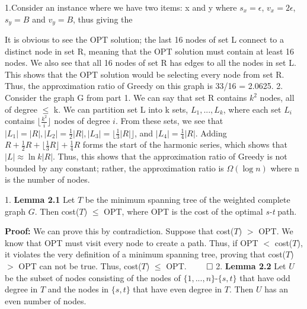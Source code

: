 \documentclass[oneside]{homework} %
\begin{document}
\maketitle
\skipevenpage

{\large1.}Consider an instance where we have two items: x and y where $s_x = \epsilon$, $v_x = 2\epsilon$, $s_y = B$ and $v_y =B$, thus giving the 

It is obvious to see the OPT solution; the last 16 nodes of set L connect to a distinct node in set R, meaning that the OPT solution must contain at least 16 nodes. We also see that all 16 nodes of set R has edges to all the nodes in set L. This shows that the OPT solution would be selecting every node from set R. Thus, the approximation ratio of Greedy on this graph is 33/16 = 2.0625.
\newline
\newline
{\large2.} Consider the graph G from part 1. We can say that set R contains $k^2$ nodes, all of degree $\leq$ k. We can partition set L into k sets, $L_1,...,L_k$, where each set $L_i$ contains $\lfloor$$\frac{k^2}{i}$$\rfloor$ nodes of degree $i$. From these sets, we see that $|L_1| = |R|, |L_2| = \frac{1}{2}|R|, |L_3| = \lfloor\frac{1}{3}|R|\rfloor$, and $|L_4| = \frac{1}{4}|R|$. Adding $R+\frac{1}{2}R+\lfloor\frac{1}{3}R\rfloor+\frac{1}{4}R$ forms the start of the harmonic series, which shows that $|L|\approx \ln{k}|R|$. Thus, this shows that the approximation ratio of Greedy is not bounded by any constant; rather, the approximation ratio is $\Omega(\log{n})$ where n is the number of nodes.

{\large1.} \textbf{Lemma 2.1} Let $T$ be the minimum spanning tree of the weighted complete graph $G$. Then cost($T$) $\leq$ OPT, where OPT is the cost of the optimal \textit{s-t} path.
\newline

\textbf{Proof:} We can prove this by contradiction. Suppose that cost($T$) $>$ OPT. We know that OPT must visit every node to create a path. Thus, if OPT $<$ cost($T$), it violates the very definition of a minimum spanning tree, proving that cost($T$) $>$ OPT can not be true. Thus, cost($T$) $\leq$ OPT. \hfill$\qed$
\newline
\newline
{\large2.} \textbf{Lemma 2.2} Let $U$ be the subset of nodes consisting of the nodes of $\{1,...,n\}$-$\{s,t\}$ that have odd degree in $T$ and the nodes in $\{s,t\}$ that have even degree in $T$. Then $U$ has an even number of nodes.
\newline
\end{document}
